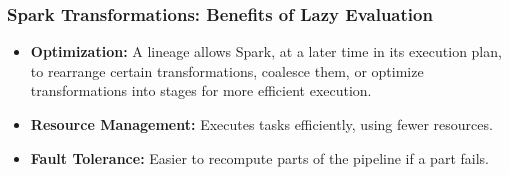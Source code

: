 \begin{frame}
    \frametitle{Spark Transformations: Benefits of Lazy Evaluation}
    \begin{itemize}
        \item \textbf{Optimization:} A lineage allows Spark, at a later time in its execution plan, to rearrange certain transformations, coalesce
        them, or optimize transformations into stages for more efficient execution.
        \item \textbf{Resource Management:} Executes tasks efficiently, using fewer resources.
        \item \textbf{Fault Tolerance:} Easier to recompute parts of the pipeline if a part fails.
    \end{itemize}
\end{frame}

